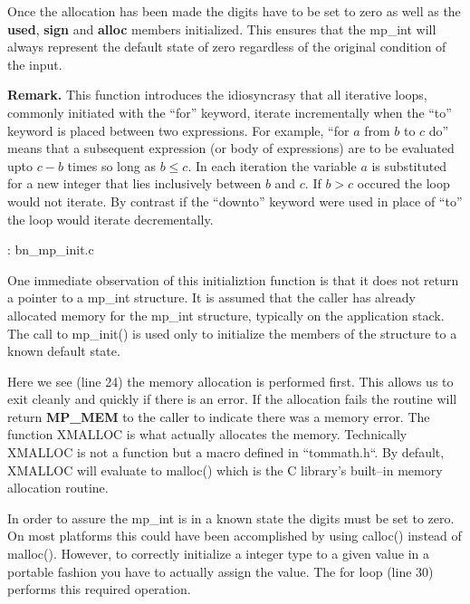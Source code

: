 \documentclass[b5paper]{book}
\begin{document}
Once the allocation has been made the digits have to be set to zero as well as the \textbf{used}, \textbf{sign} and
\textbf{alloc} members initialized.  This ensures that the mp\_int will always represent the default state of zero regardless
of the original condition of the input.

\textbf{Remark.}
This function introduces the idiosyncrasy that all iterative loops, commonly initiated with the ``for'' keyword, iterate incrementally
when the ``to'' keyword is placed between two expressions.  For example, ``for $a$ from $b$ to $c$ do'' means that
a subsequent expression (or body of expressions) are to be evaluated upto $c - b$ times so long as $b \le c$.  In each
iteration the variable $a$ is substituted for a new integer that lies inclusively between $b$ and $c$.  If $b > c$ occured
the loop would not iterate.  By contrast if the ``downto'' keyword were used in place of ``to'' the loop would iterate 
decrementally.

\vspace{+3mm}\begin{small}
\hspace{-5.1mm}{\bf File}: bn\_mp\_init.c
\vspace{-3mm}
\begin{alltt}
\end{alltt}
\end{small}

One immediate observation of this initializtion function is that it does not return a pointer to a mp\_int structure.  It 
is assumed that the caller has already allocated memory for the mp\_int structure, typically on the application stack.  The 
call to mp\_init() is used only to initialize the members of the structure to a known default state.  

Here we see (line 24) the memory allocation is performed first.  This allows us to exit cleanly and quickly
if there is an error.  If the allocation fails the routine will return \textbf{MP\_MEM} to the caller to indicate there
was a memory error.  The function XMALLOC is what actually allocates the memory.  Technically XMALLOC is not a function
but a macro defined in ``tommath.h``.  By default, XMALLOC will evaluate to malloc() which is the C library's built--in
memory allocation routine.

In order to assure the mp\_int is in a known state the digits must be set to zero.  On most platforms this could have been
accomplished by using calloc() instead of malloc().  However,  to correctly initialize a integer type to a given value in a 
portable fashion you have to actually assign the value.  The for loop (line 30) performs this required
operation.
\end{document}
